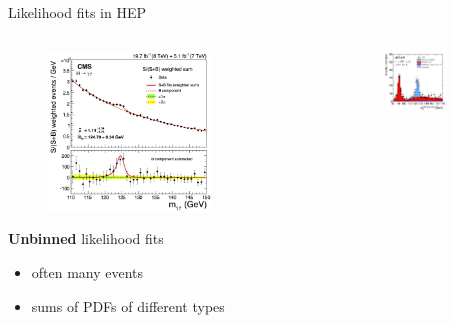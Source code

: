 \documentclass[aspectratio=169]{beamer}
\begin{document}
\begin{frame}{Likelihood fits in HEP}
\vspace{-0.5cm}
\begin{columns}
\begin{column}{0.5\textwidth}
    \begin{figure}
        \includegraphics[width=0.7\textwidth]{gammagamma.png}
    \end{figure}
    \textbf{Unbinned} likelihood fits
    \begin{itemize}
        \item often many events
        \item sums of PDFs of different types
    \end{itemize}
\end{column}
\begin{column}{0.5\textwidth}
    \begin{figure}
        \includegraphics[width=0.7\textwidth]{fourleptons.png}

\end{figure}
\end{column}
\end{columns}
\end{frame}
\end{document}
